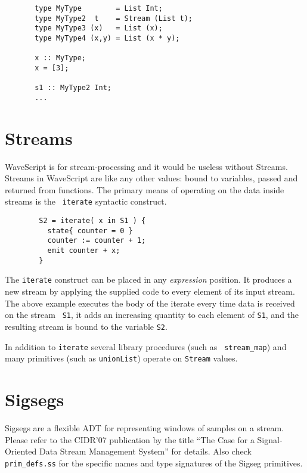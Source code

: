 \documentclass[twocolumn]{report}
\begin{document}
\begin{center}
\begin{verbatim}
       type MyType        = List Int;
       type MyType2  t    = Stream (List t);
       type MyType3 (x)   = List (x);
       type MyType4 (x,y) = List (x * y);

       x :: MyType;
       x = [3];

       s1 :: MyType2 Int;
       ...
\end{verbatim}
\end{center}


\section{Streams}

WaveScript is for stream-processing and it would be useless without
Streams.  
Streams in WaveScript are like any other values: bound to variables,
passed and returned from functions.
The primary means of operating on the data inside streams is the {\tt
  iterate} syntactic construct.

\begin{verbatim}
        S2 = iterate( x in S1 ) {
          state{ counter = 0 }
          counter := counter + 1;
          emit counter + x;
        }
\end{verbatim}

The {\tt iterate} construct can be placed in any {\em expression}
position.  It produces a new stream by applying the supplied code to
every element of its input stream.  The above example executes the
body of the iterate every time data is received on the stream {\tt
  S1}, it adds an increasing quantity to each element of {\tt S1}, and the
resulting stream is bound to the variable {\tt S2}.

In addition to {\tt iterate} several library procedures (such as {\tt
stream\_map}) and many primitives (such as {\tt unionList}) operate on
{\tt Stream} values.





\section{Sigsegs}

Sigsegs are a flexible ADT for representing windows of samples on a stream.
Please refer to the CIDR'07 publication by the title 
``The Case for a Signal-Oriented Data Stream Management System'' for
details.  Also check {\tt prim\_defs.ss} for the specific names and
type signatures of the Sigseg primitives.
\end{document}
